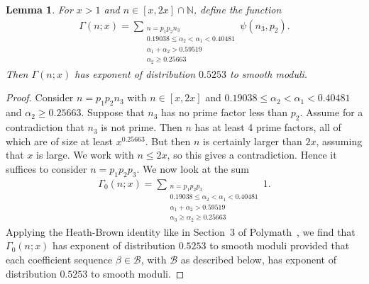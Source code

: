 \documentclass{amsart}
\newtheorem{lemma}{Lemma}
\numberwithin{equation}{section}
\begin{document}
\begin{lemma} \label{lem:3primes}
For $x>1$ and $n \in [x,2x] \cap \mathbb{N}$, define the function
\begin{align*}
\Gamma(n;x)=\sum_{\substack{ n = p_1p_2n_3 \\ 0.19038 \leq \alpha_2 < \alpha_1 < 0.40481 \\ \alpha_1+\alpha_2 > 0.59519 \\ \alpha_2 \geq 0.25663}} \psi(n_3, p_2).
\end{align*}
Then $\Gamma(n;x)$ has exponent of distribution  $0.5253$ to smooth moduli. 
\end{lemma}

\begin{proof}
Consider $n=p_1p_2n_3$ with $n \in [x,2x]$ and  $0.19038 \leq \alpha_2 < \alpha_1 < 0.40481$ and  $\alpha_2 \geq 0.25663$. Suppose that $n_3$ has no prime factor less than $p_2$.  Assume for a contradiction that $n_3$ is not prime. Then $n$ has at least 4 prime factors, all of which are of size at least $x^{0.25663}$. But then $n$ is certainly larger than $2x$, assuming that $x$ is large. We work with $n\leq 2x$, so this gives a contradiction. Hence it suffices to consider $n=p_1p_2p_3$.  We now look at the sum 
\begin{align*}
\Gamma_0(n;x)=\sum_{\substack{ n = p_1p_2p_3 \\ 0.19038 \leq \alpha_2 < \alpha_1 < 0.40481 \\ \alpha_1+\alpha_2 > 0.59519 \\ \alpha_3 \geq \alpha_2 \geq 0.25663 }} 1.
\end{align*}
Applying the Heath-Brown identity like in Section~3 of Polymath~\cite{Polymath:2014:EDZ}, we find that $\Gamma_0(n;x)$ has exponent of distribution $0.5253$ to smooth moduli provided that each coefficient sequence $\beta \in \mathcal{B}$, with $\mathcal{B}$ as described below, has exponent of distribution $0.5253$ to smooth moduli.


\end{proof}
\end{document}
